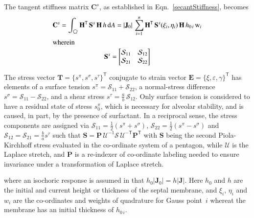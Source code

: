 The tangent stiffness matrix $\mathbf{C}^s$, as established in Eqn.~\eqref{secantStiffness}, becomes 
\begin{subequations}
	\begin{gather}
		\mathbf{C}^s = \int_{\pentagon} \mathbf{H}^{\mathsf{T}} \,  \mathbf{S}^s \, \mathbf{H} \, h \, \mathrm{d} A
		=  | \mathbf{J}_0 |  \, \sum_{i=1}^{n} \mathbf{H}^{\mathsf{T}} \, \mathbf{S}^s (\xi_i , \eta_i) \, \mathbf{H} \, h_{0\,i} \, \mathrm{w}_i \\
        \intertext{wherein}
        \mathbf{S}^s = \begin{bmatrix}
        	\mathcal{S}_{11} & \mathcal{S}_{12} \\
        	\mathcal{S}_{21} & \mathcal{S}_{22}
        \end{bmatrix}
    \label{stressMtx2D}
	\end{gather}
\end{subequations}

The stress vector $\boldsymbol{T} = \{ s^{\pi}, s^{\sigma}, s^{\tau} \}^{\mathsf{T}}$ conjugate to strain vector $\boldsymbol{E} = \{ \xi, \varepsilon, \gamma \}^{\mathsf{T}}$ has elements of a surface tension $s^{\pi} = \mathcal{S}_{11} + \mathcal{S}_{22}$, a normal-stress difference $s^{\sigma} = \mathcal{S}_{11} - \mathcal{S}_{22}$, and a shear stress $s^{\tau} = \tfrac{a}{b} \, \mathcal{S}_{12}$.  Only surface tension is considered to have a residual state of stress $s^{\pi}_0$, which is necessary for alveolar stability, and is caused, in part, by the presence of surfactant.  In a reciprocal sense, the stress components are assigned via $\mathcal{S}_{11} = \frac{1}{2} ( s^{\pi} + s^{\sigma} )$, $\mathcal{S}_{22} = \frac{1}{2} ( s^{\pi} - s^{\sigma} )$ and $\mathcal{S}_{12} = \mathcal{S}_{21} = \frac{b}{a} s^{\tau}$ such that $\mathbf{S} = \mathbf{P} \, \boldsymbol{\mathcal{U}}^{-1} \boldsymbol{\mathcal{S}} \, \boldsymbol{\mathcal{U}}^{-\mathsf{T}} \mathbf{P}^{\mathsf{T}}$ with $\mathbf{S}$ being the second Piola-Kirchhoff stress evaluated in the co-ordinate system of a pentagon, while $\boldsymbol{\mathcal{U}}$ is the Laplace stretch, and $\mathbf{P}$ is a re-indexer of co-ordinate labeling needed to ensure invariance under a transformation of Laplace stretch.

where an isochoric response is assumed in that $h_0 | \mathbf{J}_0 | = h | \mathbf{J} |$. Here $h_0$ and $h$ are the initial and current height or thickness of the septal membrane, and $\xi_i$, $\eta_i$ and $w_i$ are the co-ordinates and weights of quadrature for Gauss point~$i$ whereat the membrane has an initial thickness of $h_{0\,i}$. 

